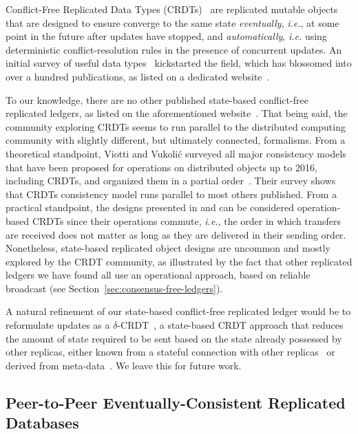 \documentclass[9pt]{article}   	%
\begin{document}
Conflict-Free Replicated Data Types (CRDTs)~\cite{shapiro:hal-00932836} are replicated mutable objects that are designed to ensure converge to the same state \textit{eventually}, \textit{i.e.}, at some point in the future after updates have stopped, and \textit{automatically}, \textit{i.e.} using deterministic conflict-resolution rules in the presence of concurrent updates. An initial survey of useful data types~\cite{shapiro:inria-00555588} kickstarted the field, which has blossomed into over a hundred publications, as listed on a dedicated website~\cite{crdt-website}.

To our knowledge, there are no other published state-based conflict-free replicated ledgers, as listed on the aforementioned website~\cite{crdt-website}. That being said, the community exploring CRDTs seems to run parallel to the distributed computing community with slightly different, but ultimately connected, formalisms. From a theoretical standpoint, Viotti and  Vukoli\'{c} surveyed all major consistency models that have been proposed for operations on distributed objects up to 2016, including CRDTs,  and organized them in a partial order~\cite{viotti2016consistency-db-survey}. Their survey shows that CRDTs consistency model runs parallel to most others published. From a practical standpoint, the designs presented in \cite{guerraoui2021consensus} and \cite{collins2020broadcast-payment} can be considered operation-based CRDTs since their operations commute, \textit{i.e.}, the order in which transfers are received does not matter as long as they are delivered in their sending order. Nonetheless, state-based replicated object designs are uncommon and mostly explored by the CRDT community, as illustrated by the fact that other replicated ledgers we have found all use an operational approach, based on reliable broadcast (see Section~\ref{sec:consensus-free-ledgers}).

A natural refinement of our state-based conflict-free replicated ledger would be to reformulate updates as a $\delta$-CRDT~\cite{Almeida2018delta}, a state-based CRDT approach that reduces the amount of state required to be sent based on the state already possessed by other replicas, either known from a stateful connection with other replicas~\cite{Almeida2018delta} or derived from meta-data~\cite{vanderLinde06delta}. We leave this for future work.

\subsection{Peer-to-Peer Eventually-Consistent Replicated Databases}
\label{sec:p2p-db}
\end{document}
